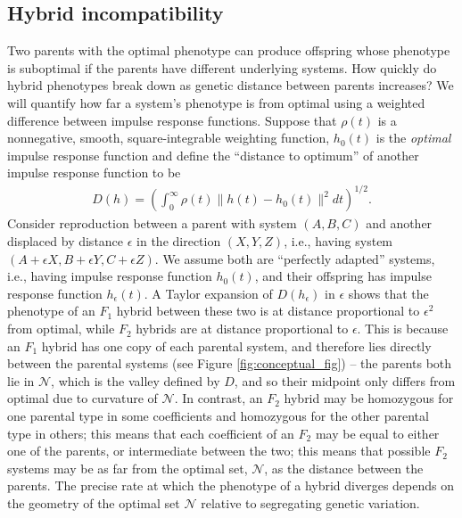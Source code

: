 \documentclass{article}
\newcommand{\1}{\mathbbm{1}}
\newcommand{\allS}{\mathcal{N}}
\begin{document}
\subsection*{Hybrid incompatibility}
Two parents with the optimal phenotype can produce offspring whose phenotype is suboptimal
if the parents have different underlying systems.
How quickly do hybrid phenotypes break down as genetic distance between parents increases?
We will quantify how far a system's phenotype is from optimal
using a weighted difference between impulse response functions.
Suppose that $\rho(t)$ is a nonnegative, smooth, square-integrable weighting function,
$h_0(t)$ is the \emph{optimal} impulse response function
and define the ``distance to optimum'' of another impulse response function
to be
\begin{align}
\label{eqn:distance}
	D(h) = \left( \int_0^\infty \rho(t) \|h(t) - h_0(t)\|^2 dt \right)^{1/2} .
\end{align}
Consider reproduction between a parent with system $(A, B, C)$ 
and another displaced by distance $\epsilon$ in the direction $(X,Y,Z)$,
i.e., having  system $(A + \epsilon X, B + \epsilon Y, C + \epsilon Z)$.
We assume both are ``perfectly adapted'' systems, 
i.e., having impulse response function $h_0(t)$,
and their offspring has impulse response function $h_\epsilon(t)$.
A Taylor expansion of $D(h_\epsilon)$ in $\epsilon$ %
shows that the phenotype of an $F_1$ hybrid between these two is at distance proportional to $\epsilon^2$ from optimal,
while $F_2$ hybrids are at distance proportional to $\epsilon$.
This is because an $F_1$ hybrid has one copy of each parental system,
and therefore lies directly between the parental systems (see Figure \ref{fig:conceptual_fig}) --
the parents both lie in $\allS$, which is the valley defined by $D$,
and so their midpoint only differs from optimal due to curvature of $\allS$.
In contrast, an $F_2$ hybrid may be homozygous for one parental type in some coefficients
and homozygous for the other parental type in others;
this means that each coefficient of an $F_2$ may be equal to either one of the parents,
or intermediate between the two;
this means that possible $F_2$ systems may be as far from the optimal set, $\allS$,
as the distance between the parents.
The precise rate at which the phenotype of a hybrid diverges depends on the geometry
of the optimal set $\allS$ relative to segregating genetic variation.
\end{document}
